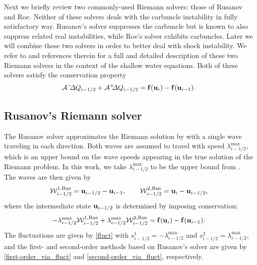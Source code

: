 \documentclass[preprint, 11pt]{article}
\newcommand{\W}{{\mathcal W}}
\newcommand{\A}{{\mathcal A}}
\newcommand{\apdq}{\A^+ \!\!{\Delta} Q}
\newcommand{\amdq}{\A^- \!\!{\Delta} Q}
\newcommand{\imh}{{i-1/2}}
\newcommand{\bff}{{\bf f}}
\newcommand{\bfu}{{\bf u}}
\newcommand{\Rus}{{\rm Rus}}
\begin{document}
Next we briefly review two commonly-used Riemann solvers: those of Rusanov and
Roe.  Neither of these solvers deals with the carbuncle instability in fully
satisfactory way.  Rusanov's solver suppresses the carbuncle but is known to
also suppress related real instabilities, while Roe's solver exhibits carbuncles.
Later we will combine these two solvers in order to better deal with shock instability.
We refer to \cite{ketcheson2020riemann} and references therein for
a full and detailed description of these two Riemann solvers in the context of
the shallow water equations.  Both of these solvers satisfy the conservation
property
\begin{align} \label{rs_conservation}
    \amdq_\imh + \apdq_\imh = \bff(\bfu_i) - \bff(\bfu_{i-1}).
\end{align}


\subsection{Rusanov's Riemann solver}\label{sec:rusanov}
The Rusanov solver approximates the Riemann solution by with a single wave traveling in each
direction.  Both waves are assumed to travel with speed $\lambda^{\max}_\imh$, which is an
upper bound on the wave speeds appearing in the true solution of the Riemann problem.
In this work, we take $\lambda_{i-1/2}^{\max}$ to be the upper bound
from \cite[Prop. 3.7]{azerad2017well}.
The waves are then given by
\begin{align}\label{rusanov_waves}
  \W_{i-1/2}^{1,\Rus}=\bfu_{i-1/2}-\bfu_{i-1}, \qquad
  \W_{i-1/2}^{2,\Rus}=\bfu_{i}-\bfu_{i-1/2},
\end{align}
where the intermediate state $\bfu_{i-1/2}$ is determined by imposing conservation:
\begin{align}\label{rus_cons}
  -\lambda_{i-1/2}^{\max}\W_{i-1/2}^{1,\Rus}+\lambda_{i-1/2}^{\max}\W_{i-1/2}^{2,\Rus} = \bff(\bfu_{i})-\bff(\bfu_{i-1}).
\end{align}
The fluctuations are given by \eqref{fluct} with $s_{i-1/2}^1=-\lambda_{i-1/2}^{\max}$
and $s_{i-1/2}^2=\lambda_{i-1/2}^{\max}$, and the first- and second-order methods based
on Rusanov's solver are given by \eqref{first-order_via_fluct} and \eqref{second-order_via_fluct}, respectively.
\end{document}
